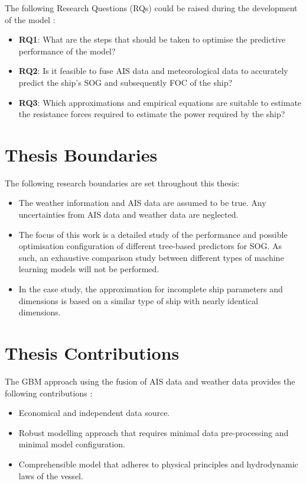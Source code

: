 \pagebreak

The following Research Questions (RQs) could be raised during the development of the model :

\begin{itemize}
    \item \textbf{RQ1}: What are the steps that should be taken to optimise the predictive performance of the model?
    \item \textbf{RQ2}: Is it feasible to fuse AIS data and meteorological data to accurately predict the ship's SOG and subsequently FOC of the ship?
    \item \textbf{RQ3}: Which approximations and empirical equations are suitable to estimate the resistance forces required to estimate the power required by the ship? 
\end{itemize} 

\section{Thesis Boundaries}\label{sec:boundaries}

The following research boundaries are set throughout this thesis:

\begin{itemize}
    \item The weather information and AIS data are assumed to be true. Any uncertainties from AIS data and weather data are neglected. 
    \item The focus of this work is a detailed study of the performance and possible optimisation configuration of different tree-based predictors for SOG. As such, an exhaustive comparison study between different types of machine learning models will not be performed.
    \item In the case study, the approximation for incomplete ship parameters and dimensions is based on a similar type of ship with nearly identical dimensions. 
\end{itemize}

\section{Thesis Contributions}\label{sec:contributions}

The GBM approach using the fusion of AIS data and weather data provides the following contributions : 

\begin{itemize}
    \item Economical and independent data source.
    \item Robust modelling approach that requires minimal data pre-processing and minimal model configuration.
    \item Comprehensible model that adheres to physical principles and hydrodynamic laws of the vessel.  
\end{itemize} 

